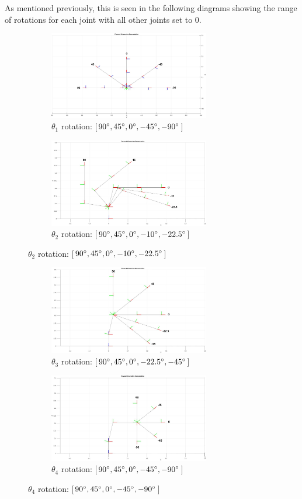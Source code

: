 \documentclass[9pt, a4paper]{article}
\begin{document}
As mentioned previously, this is seen in the following diagrams showing the range of rotations
for each joint with all other joints set to 0.
\begin{figure}[h]
  \centering
  \begin{subfigure}{.5\textwidth}
    \centering
    \includegraphics[width=7cm]{theta1.JPG}
    \caption{$\theta_1$ rotation: [$90\degree, 45\degree, 0\degree, -45\degree, -90\degree$]}
  \end{subfigure}%
  \begin{subfigure}{.5\textwidth}
    \centering
    \includegraphics[width=7cm]{theta2.JPG}
    \caption{$\theta_2$ rotation: [$90\degree, 45\degree, 0\degree, -10\degree, -22.5\degree$]}
  \end{subfigure}
\end{figure}
\begin{figure}[h]
  \centering
  \begin{subfigure}{.5\textwidth}
    \centering
    \addtocounter{subfigure}{2}
    \includegraphics[width=7cm]{theta3.JPG}
    \caption{$\theta_3$ rotation: [$90\degree, 45\degree, 0\degree, -22.5\degree, -45\degree$]}
  \end{subfigure}%
  \begin{subfigure}{.5\textwidth}
    \centering
    \includegraphics[width=7cm]{theta4.JPG}
    \caption{$\theta_4$ rotation: [$90\degree, 45\degree, 0\degree, -45\degree, -90\degree$]}
  \end{subfigure}
\end{figure}
\end{document}
